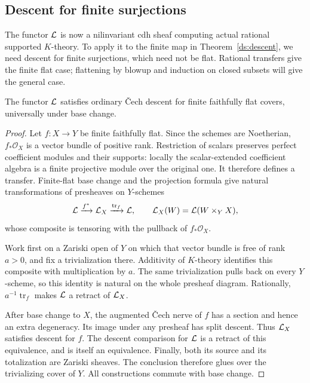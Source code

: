 \subsection{Descent for finite surjections}

The functor $\mathcal{L}$ is now a nilinvariant cdh sheaf computing actual
rational supported $K$-theory. To apply it to the finite map in
Theorem~\ref{ds:descent}, we need descent for finite surjections, which
need not be flat. Rational transfers give the finite flat case;
flattening by blowup and induction on closed subsets will give the
general case.

\begin{lemma}
\label{ds:finite-flat}
The functor $\mathcal{L}$ satisfies ordinary \v{C}ech descent for finite
faithfully flat covers, universally under base change.
\end{lemma}

\begin{proof}
Let $f:X\to Y$ be finite faithfully flat. Since the schemes are
Noetherian, $f_*\mathcal O_X$ is a vector bundle of positive rank.
Restriction of scalars preserves perfect coefficient modules and
their supports: locally the scalar-extended coefficient algebra is
a finite projective module over the original one. It therefore
defines a transfer. Finite-flat base change and the projection
formula give natural transformations of presheaves on $Y$-schemes
\[
 \mathcal{L}\xrightarrow{f^*}\mathcal{L}_X
       \xrightarrow{\operatorname{tr}_f}\mathcal{L},
 \qquad
 \mathcal{L}_X(W)=\mathcal{L}(W\times_Y X),
\]
whose composite is tensoring with the pullback of
$f_*\mathcal O_X$.

Work first on a Zariski open of $Y$ on which that vector bundle is
free of rank $a>0$, and fix a trivialization there. Additivity of
$K$-theory identifies this composite with multiplication by $a$.
The same trivialization pulls back on every $Y$-scheme, so this
identity is natural on the whole presheaf diagram. Rationally,
$a^{-1}\operatorname{tr}_f$ makes $\mathcal{L}$ a retract of $\mathcal{L}_X$.

After base change to $X$, the augmented \v{C}ech nerve of $f$ has
a section and hence an extra degeneracy. Its image under any
presheaf has split descent. Thus $\mathcal{L}_X$ satisfies descent for
$f$. The descent comparison for $\mathcal{L}$ is a retract of this
equivalence, and is itself an equivalence. Finally, both its source
and its totalization are Zariski sheaves. The conclusion therefore
glues over the trivializing cover of $Y$. All constructions commute
with base change.
\end{proof}

